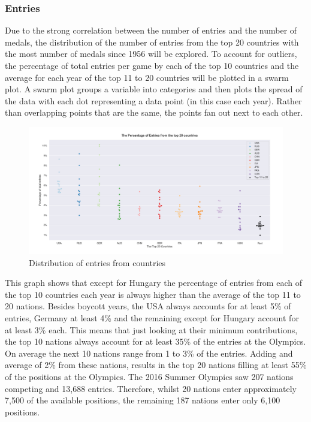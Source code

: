 \documentclass[a4 paper, 12pt]{article}
\begin{document}
        \subsubsection{Entries}
        Due to the strong correlation between the number of entries and the number of medals, the distribution of the number of entries from the top 20 countries with the most number of medals since 1956 will be explored. To account for outliers, the percentage of total entries per game by each of the top 10 countries and the average for each year of the top 11 to 20 countries will be plotted in a swarm plot. A swarm plot groups a variable into categories and then plots the spread of the data with each dot representing a data point (in this case each year). Rather than overlapping points that are the same, the points fan out next to each other. 

        \begin{figure} [H]
            \centering
            \includegraphics[width=\textwidth, frame]
                {./images/graph/countries_entryperc_swarm.png}      
                \caption{Distribution of entries from countries} 
        \end{figure}

        This graph shows that except for Hungary the percentage of entries from each of the top 10 countries each year is always higher than the average of the top 11 to 20 nations. Besides boycott years, the USA always accounts for at least 5\% of entries, Germany at least 4\% and the remaining except for Hungary account for at least 3\% each. This means that just looking at their minimum contributions, the top 10 nations always account for at least 35\% of the entries at the Olympics. On average the next 10 nations range from 1 to 3\% of the entries. Adding and average of 2\% from these nations, results in the top 20 nations filling at least 55\% of the positions at the Olympics. The 2016 Summer Olympics saw 207 nations competing and 13,688 entries. Therefore, whilst 20 nations enter approximately 7,500 of the available positions, the remaining 187 nations enter only 6,100 positions.
\end{document}
